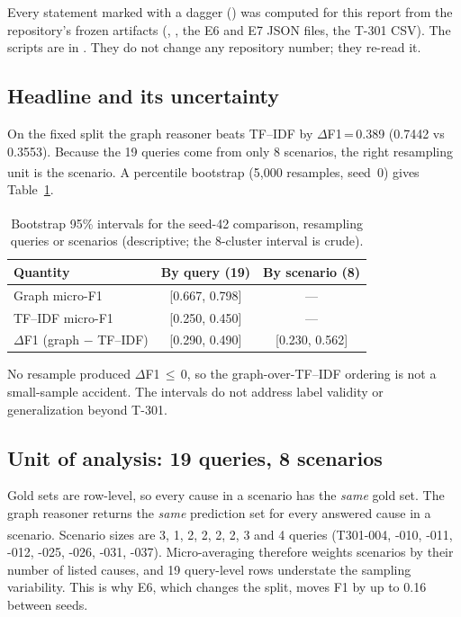\documentclass[10pt,twocolumn,a4paper]{extarticle}
\newcommand{\derived}{\textsuperscript{\textdagger}}
\newcommand{\tblsize}{\footnotesize}
\begin{document}
Every statement marked with a dagger (\textdagger) was computed for this report from the repository's frozen artifacts (, , the E6 and E7 JSON files, the T-301 CSV). The scripts are in . They do not change any repository number; they re-read it.

\subsection{Headline and its uncertainty}
On the fixed split the graph reasoner beats TF--IDF by $\Delta$F1\,=\,0.389 (0.7442 vs 0.3553). Because the 19 queries come from only 8 scenarios, the right resampling unit is the scenario. A percentile bootstrap\derived{} (5{,}000 resamples, seed~0) gives Table~\ref{tab:boot}.

\begin{table}[t]
\centering
\caption{Bootstrap 95\% intervals\derived{} for the seed-42 comparison, resampling queries or scenarios (descriptive; the 8-cluster interval is crude).}
\label{tab:boot}
\renewcommand{\tblsize}{\scriptsize}
\begin{tabular}{@{}l c c@{}}
\toprule
\textbf{Quantity} & \textbf{By query (19)} & \textbf{By scenario (8)}\\
\midrule
Graph micro-F1 & [0.667, 0.798] & ---\\
TF--IDF micro-F1 & [0.250, 0.450] & ---\\
$\Delta$F1 (graph $-$ TF--IDF) & [0.290, 0.490] & [0.230, 0.562]\\
\bottomrule
\end{tabular}
\end{table}
No resample produced $\Delta$F1\,$\le$\,0, so the graph-over-TF--IDF ordering is not a small-sample accident. The intervals do not address label validity or generalization beyond T-301.

\subsection{Unit of analysis: 19 queries, 8 scenarios}\label{sec:unit}
Gold sets are row-level, so every cause in a scenario has the \emph{same} gold set. The graph reasoner returns the \emph{same} prediction set for every answered cause in a scenario.\derived{} Scenario sizes are 3, 1, 2, 2, 2, 2, 3 and 4 queries (T301-004, -010, -011, -012, -025, -026, -031, -037). Micro-averaging therefore weights scenarios by their number of listed causes, and 19 query-level rows understate the sampling variability. This is why E6, which changes the split, moves F1 by up to 0.16 between seeds.
\end{document}
